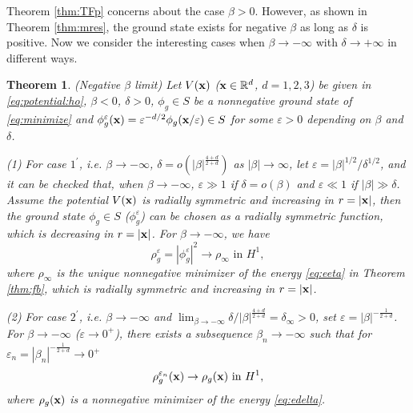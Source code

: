 \documentclass{elsarticle}
\newcommand{\vep}{\varepsilon}
\newcommand{\be}{\begin{equation}}
\newcommand{\ee}{\end{equation}}
\newtheorem{theorem}{Theorem}[section]
\newcommand{\bx}{{\bf x} }
\renewcommand{\ldots}{\dotsc}
\begin{document}
Theorem \ref{thm:TFp} concerns about the case $\beta>0$. However, as shown in Theorem \ref{thm:mres}, the ground state exists for negative $\beta$ as long as $\delta$ is positive.
Now we consider the interesting cases when $\beta\to-\infty$ with $\delta\to+\infty$ in different ways.
\begin{theorem}\label{thm:tfneg}
(Negative $\beta$ limit) Let $V(\bx)$ ($\bx\in\Bbb R^d$, $d=1,2,3$) be given in \eqref{eq:potential:ho}, $\beta<0$, $\delta>0$, $\phi_g\in S$
be a nonnegative ground state of \eqref{eq:minimize} and $\phi_g^\vep(\bx)=\vep^{-d/2}\phi_g(\bx/\vep)\in S$ for some $\vep>0$ depending on $\beta$ and $\delta$.

(1) For case $1^\prime$, i.e. $\beta\to-\infty$, $\delta=o(|\beta|^{\frac{4+d}{2+d}})$ as $|\beta|\to\infty$,
let %
$\varepsilon=|\beta|^{1/2}/\delta^{1/2}$, and it can be checked that, when $\beta\to-\infty$, $\varepsilon\gg1$ if $\delta=o(\beta)$ and $\varepsilon\ll1$ if $|\beta|\gg\delta$.
Assume the potential $V(\bx)$
  is radially symmetric and increasing in $r=|\bx|$, then the ground state $\phi_g\in S$ ($\phi_g^\vep$) can be chosen as a
radially symmetric function, which is decreasing in $r=|\bx|$. For $\beta\to-\infty$, we have
\be
\rho_g^\vep=|\phi_g^\vep|^2\to \rho_{\infty} \text{ in  } H^1,
\ee
where $\rho_\infty$ is the unique nonnegative minimizer of the energy \eqref{eq:eeta} in Theorem \ref{thm:fb}, which is radially symmetric and increasing in $r=|\bx|$.

(2) For case $2^\prime$, i.e. $\beta\to -\infty$ and %
 $\lim_{\beta\to-\infty}\delta/|\beta|^{\frac{4+d}{2+d}}=\delta_\infty>0$,
set %
$\vep=|\beta|^{-\frac{1}{2+d}}$. For $\beta\to-\infty$ ($\vep\to0^+$),
 there exists a subsequence $\beta_n\to-\infty$ %
such that for $\vep_n=|\beta_n|^{-\frac{1}{2+d}}\to0^+$ %
\be
\rho_g^{\vep_n}(\bx)\to \rho_g(\bx) \text{ in } H^1,
\ee
 where $\rho_g(\bx)$ is a nonnegative minimizer of the energy \eqref{eq:edelta}.


\end{theorem}
\end{document}

